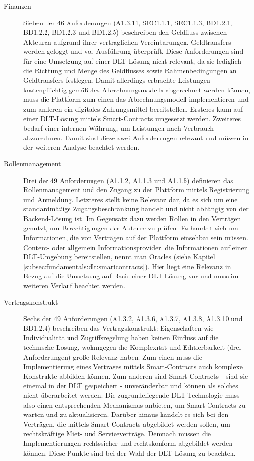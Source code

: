 \begin{description}
  \item[Finanzen] Sieben der 46 Anforderungen (A1.3.11, SEC1.1.1, SEC1.1.3, BD1.2.1, BD1.2.2, BD1.2.3 und BD1.2.5) beschreiben den Geldfluss zwischen Akteuren aufgrund ihrer vertraglichen Vereinbarungen. Geldtransfers werden geloggt und vor Ausführung überprüft. Diese Anforderungen sind für eine Umsetzung auf einer \ac{DLT}-Lösung nicht relevant, da sie lediglich die Richtung und Menge des Geldflusses sowie Rahmenbedingungen an Geldtransfers festlegen. Damit allerdings erbrachte Leistungen kostenpflichtig gemäß des Abrechnungsmodells abgerechnet werden können, muss die Plattform zum einen das Abrechnungsmodell implementieren und zum anderen ein digitales Zahlungsmittel bereitstellen. Ersteres kann auf einer \ac{DLT}-Lösung mittels Smart-Contracts umgesetzt werden. Zweiteres bedarf einer internen Währung, um Leistungen nach Verbrauch abzurechnen. Damit sind diese zwei Anforderungen relevant und müssen in der weiteren Analyse beachtet werden.
  \item[Rollenmanagement] Drei der 49 Anforderungen (A1.1.2, A1.1.3 und A1.1.5) definieren das Rollenmanagement und den Zugang zu der Plattform mittels Registrierung und Anmeldung. Letzteres stellt keine Relevanz dar, da es sich um eine standardmäßige Zugangsbeschränkung handelt und nicht abhängig von der Backend-Lösung ist. Im Gegensatz dazu werden Rollen in den Verträgen genutzt, um Berechtigungen der Akteure zu prüfen. Es handelt sich um Informationen, die von Verträgen auf der Plattform einsehbar sein müssen. Content- oder allgemein Informationsprovider, die Informationen auf einer \ac{DLT}-Umgebung bereitstellen, nennt man Oracles (siehe Kapitel \ref{subsec:fundamentals:dlt:smartcontracts}). Hier liegt eine Relevanz in Bezug auf die Umsetzung auf Basis einer \ac{DLT}-Lösung vor und muss im weiteren Verlauf beachtet werden.
  \item[Vertragskonstrukt] Sechs der 49 Anforderungen (A1.3.2, A1.3.6, A1.3.7, A1.3.8, A1.3.10 und BD1.2.4) beschreiben das Vertragskonstrukt: Eigenschaften wie Individualität und Zugriffsregelung haben keinen Einfluss auf die technische Lösung, wohingegen die Komplexität und Editierbarkeit (drei Anforderungen) große Relevanz haben. Zum einen muss die Implementierung eines Vertrages mittels Smart-Contracts auch komplexe Konstrukte abbilden können. Zum anderen sind Smart-Contracts - sind sie einemal in der \ac{DLT} gespeichert - unveränderbar und können als solches nicht überarbeitet werden. Die zugrundeliegende \ac{DLT}-Technologie muss also einen entsprechenden Mechanismus anbieten, um Smart-Contracts zu warten und zu aktualisieren. Darüber hinaus handelt es sich bei den Verträgen, die mittels Smart-Contracts abgebildet werden sollen, um rechtskräftige Miet- und Serviceverträge. Demnach müssen die Implementierungen rechtssicher und rechtskonform abgebildet werden können. Diese Punkte sind bei der Wahl der \ac{DLT}-Lösung zu beachten.
\end{description}


